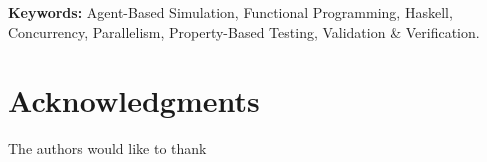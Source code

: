 \documentclass{scspaperproc}
\begin{document}
\textbf{Keywords:} Agent-Based Simulation, Functional Programming, Haskell, Concurrency, Parallelism, Property-Based Testing, Validation \& Verification.

\maketitle













\section*{Acknowledgments}
The authors would like to thank




\appendix

\newpage



\end{document}
